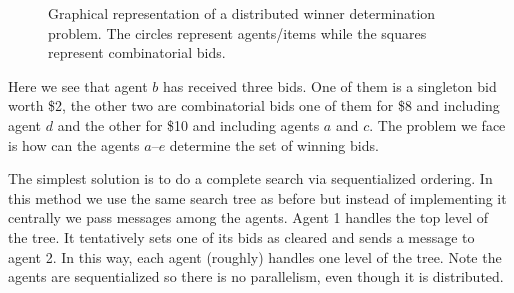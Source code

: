 \begin{figure}
  \begin{minipage}{1.0\linewidth}
    \begin{center}
    \end{center}
  \end{minipage}
  \caption{Graphical representation of a distributed winner
    determination problem. The circles represent agents/items while
    the squares represent combinatorial bids.}
  \label{fig:dwt}
\end{figure}

Here we see that agent $b$ has received three bids. One of them is a
singleton bid worth \$2, the other two are combinatorial bids one of
them for \$8 and including agent $d$ and the other for \$10 and
including agents $a$ and $c$. The problem we face is how can the
agents $a$--$e$ determine the set of winning bids. 

The simplest solution is to do a complete search via sequentialized
ordering. In this method we use the same search tree as before but
instead of implementing it centrally we pass messages among the
agents. Agent 1 handles the top level of the tree. It tentatively sets
one of its bids as cleared and sends a message to agent 2. In this
way, each agent (roughly) handles one level of the tree. Note the
agents are sequentialized so there is no parallelism, even though it
is distributed.

